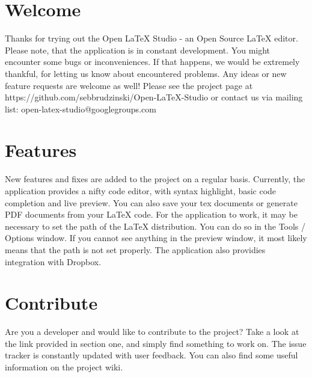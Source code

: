 \documentclass[12pt]{article}
\title{Open \LaTeX{} Studio - ${pom.version}}
\date{}
\author{Sebastian Brudzinski}
\begin{document}
  \maketitle
  \section{Welcome}
  Thanks for trying out the Open \LaTeX{} Studio - an Open Source \LaTeX{} editor. Please note, that the
  application is in constant development. You might encounter some bugs or inconveniences. If that happens, 
  we would be extremely thankful, for letting us know about encountered problems. Any ideas or new feature
  requests are welcome as well! Please see the project page at 
  https://github.com/sebbrudzinski/Open-LaTeX-Studio
  or contact us via mailing list: open-latex-studio@googlegroups.com

  \section{Features}
  New features and fixes are added to the project on a regular basis. Currently, the application provides
  a nifty code editor, with syntax highlight, basic code completion and live preview. You can also save your tex 
  documents or generate PDF documents from your \LaTeX{} code. For the application to work, it may be necessary to 
  set the path of the LaTeX distribution. You can do so in the Tools / Options window. If you cannot see anything in the preview window, it most likely means that
  the path is not set properly. The application also providies integration with Dropbox. 

  \section{Contribute}
  Are you a developer and would like to contribute to the project? Take a look at the link provided in section one, 
  and simply find something to work on. The issue tracker is constantly updated with user feedback. You can also
  find some useful information on the project wiki.
\end{document}

